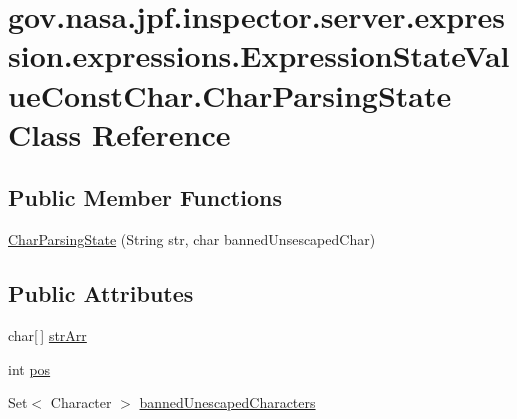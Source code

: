 \hypertarget{classgov_1_1nasa_1_1jpf_1_1inspector_1_1server_1_1expression_1_1expressions_1_1_expression_state3e52eea711d5518799170688e70a0d37}{}\section{gov.\+nasa.\+jpf.\+inspector.\+server.\+expression.\+expressions.\+Expression\+State\+Value\+Const\+Char.\+Char\+Parsing\+State Class Reference}
\label{classgov_1_1nasa_1_1jpf_1_1inspector_1_1server_1_1expression_1_1expressions_1_1_expression_state3e52eea711d5518799170688e70a0d37}
\subsection*{Public Member Functions}
\begin{DoxyCompactItemize}
\item 
\hyperlink{classgov_1_1nasa_1_1jpf_1_1inspector_1_1server_1_1expression_1_1expressions_1_1_expression_state3e52eea711d5518799170688e70a0d37_a436de96c45eb8f9fa4707dcb6d81d587}{Char\+Parsing\+State} (String str, char banned\+Unsescaped\+Char)
\end{DoxyCompactItemize}
\subsection*{Public Attributes}
\begin{DoxyCompactItemize}
\item 
char\mbox{[}$\,$\mbox{]} \hyperlink{classgov_1_1nasa_1_1jpf_1_1inspector_1_1server_1_1expression_1_1expressions_1_1_expression_state3e52eea711d5518799170688e70a0d37_ac2bd992b99178e0992ca84fc0c8b1551}{str\+Arr}
\item 
int \hyperlink{classgov_1_1nasa_1_1jpf_1_1inspector_1_1server_1_1expression_1_1expressions_1_1_expression_state3e52eea711d5518799170688e70a0d37_a757b709c5c3f612edbbbc1cbf57512cd}{pos}
\item 
Set$<$ Character $>$ \hyperlink{classgov_1_1nasa_1_1jpf_1_1inspector_1_1server_1_1expression_1_1expressions_1_1_expression_state3e52eea711d5518799170688e70a0d37_adaf886b0545e724fbb9d1ec4ff11dbab}{banned\+Unescaped\+Characters}
\end{DoxyCompactItemize}


